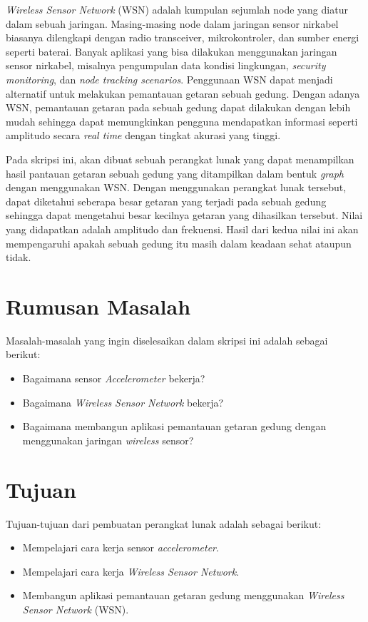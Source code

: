 \textit{Wireless Sensor Network} (WSN) adalah kumpulan sejumlah node yang diatur dalam sebuah jaringan. Masing-masing node dalam jaringan sensor nirkabel biasanya dilengkapi dengan radio transceiver, mikrokontroler, dan sumber energi seperti baterai. Banyak aplikasi yang bisa dilakukan menggunakan jaringan sensor nirkabel, misalnya pengumpulan data kondisi lingkungan, \textit{security monitoring}, dan \textit{node tracking scenarios}. Penggunaan WSN dapat menjadi alternatif untuk melakukan pemantauan getaran sebuah gedung. Dengan adanya WSN, pemantauan getaran pada sebuah gedung dapat dilakukan dengan lebih mudah sehingga dapat memungkinkan pengguna mendapatkan informasi seperti amplitudo secara \textit{real time} dengan tingkat akurasi yang tinggi.  

Pada skripsi ini, akan dibuat sebuah perangkat lunak yang dapat menampilkan hasil pantauan getaran sebuah gedung yang ditampilkan dalam bentuk \textit{graph} dengan menggunakan WSN. Dengan menggunakan perangkat lunak tersebut, dapat diketahui seberapa besar getaran yang terjadi pada sebuah gedung sehingga dapat mengetahui besar kecilnya getaran yang dihasilkan tersebut. Nilai yang didapatkan adalah amplitudo dan frekuensi. Hasil dari kedua nilai ini akan mempengaruhi apakah sebuah gedung itu masih dalam keadaan sehat ataupun tidak.

\section{Rumusan Masalah}
\label{sec:rumusan}
Masalah-masalah yang ingin diselesaikan dalam skripsi ini adalah sebagai berikut:
\begin{itemize}
	\item Bagaimana sensor \textit{Accelerometer} bekerja?
	\item Bagaimana \textit{Wireless Sensor Network} bekerja?
	\item Bagaimana membangun aplikasi pemantauan getaran gedung dengan menggunakan jaringan \textit{wireless} sensor?
\end{itemize}

\section{Tujuan}
\label{sec:tujuan}
Tujuan-tujuan dari pembuatan perangkat lunak adalah sebagai berikut:
\begin{itemize}
	\item Mempelajari cara kerja sensor \textit{accelerometer}.
	\item Mempelajari cara kerja \textit{Wireless Sensor Network}.
	\item Membangun aplikasi pemantauan getaran gedung menggunakan \textit{Wireless Sensor Network } (WSN).
\end{itemize}

